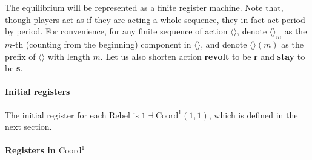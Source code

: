 \documentclass[12pt,letter]{article}
\newcommand{\Kappa}{\mathrm{Coord}}
\theoremstyle{definition}
\theoremstyle{remark}
\theoremstyle{claim}
\begin{document}
The equilibrium will be represented as a {finite register machine}. Note that, though players act as if they are acting a whole sequence, they in fact act period by period. For convenience, for any finite sequence of action $\langle \rangle$, denote $\langle \rangle_m$ as the $m$-th (counting from the beginning) component in $\langle \rangle$, and denote $\langle \rangle(m)$ as the prefix of $\langle \rangle$ with length $m$. Let us also shorten action \textbf{revolt} to be \textbf{r} and \textbf{stay} to be \textbf{s}. 

\paragraph{Initial registers}
The initial register for each Rebel is $1\dashv\Kappa^1(1,1)$, which is defined in the next section.
\paragraph{Registers in $\Kappa^1$}
\end{document}

